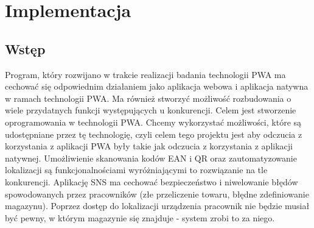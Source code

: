 \documentclass[../main.tex]{subfiles}
\begin{document}
\section{Implementacja}
    \subsection{Wstęp}
        Program, który rozwijano w trakcie realizacji badania technologii PWA ma cechować się odpowiednim działaniem jako aplikacja webowa i aplikacja natywna w ramach technologii PWA. Ma również stworzyć możliwość rozbudowania o wiele przydatnych funkcji występujących u konkurencji. Celem jest stworzenie oprogramowania w technologii PWA. Chcemy wykorzystać możliwości, które są udostępniane przez tę technologię, czyli celem tego projektu jest aby odczucia z korzystania z aplikacji PWA były takie jak odczucia z korzystania z aplikacji natywnej. Umożliwienie skanowania kodów EAN i QR oraz zautomatyzowanie lokalizacji są funkcjonalnościami wyróżniającymi to rozwiązanie na tle konkurencji. Aplikację SNS ma cechować bezpieczeństwo i niwelowanie błędów spowodowanych przez pracowników (złe przeliczenie towaru, błędne zdefiniowanie magazynu). Poprzez dostęp do lokalizacji urządzenia pracownik nie będzie musiał być pewny, w którym magazynie się znajduje - system zrobi to za niego.

    
    \newpage
    
    \newpage
          
\end{document}
